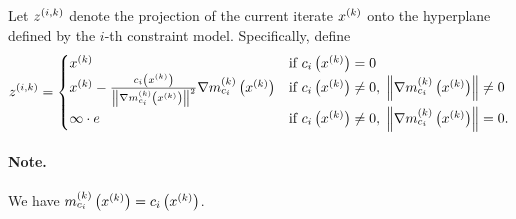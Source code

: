 Let ${z^{(i, k)}}$ denote the projection of the current iterate $x^{(k)}$ onto the hyperplane defined by the $i$-th constraint model.
Specifically, define
\begin{align}
\label{define_z}
{z^{(i, k)}} =
\begin{cases}
x^{(k)} &  \text{if } c_i\left(x^{(k)}\right) = 0 \\
x^{(k)} - \frac{c_i\left(x^{(k)}\right)}{\left\|{\nabla m_{c_i}^{(k)}\left(x^{(k)}\right)}\right\|^2} {\nabla m_{c_i}^{(k)}\left(x^{(k)}\right)}&  \text{if } c_i\left(x^{(k)}\right) \ne 0, \; \left\|{\nabla m_{c_i}^{(k)}\left(x^{(k)}\right)}\right\| \ne 0 \\
\mathbf{\infty}\cdot e & \text{if } c_i\left(x^{(k)}\right) \ne 0,  \;  \left\|{\nabla m_{c_i}^{(k)}\left(x^{(k)}\right)}\right\| = 0. \\
\end{cases}
\end{align}

\paragraph*{Note.}
We have $m^{(k)}_{c_i}\left(x^{(k)}\right) = c_i\left(x^{(k)}\right)$.

%

